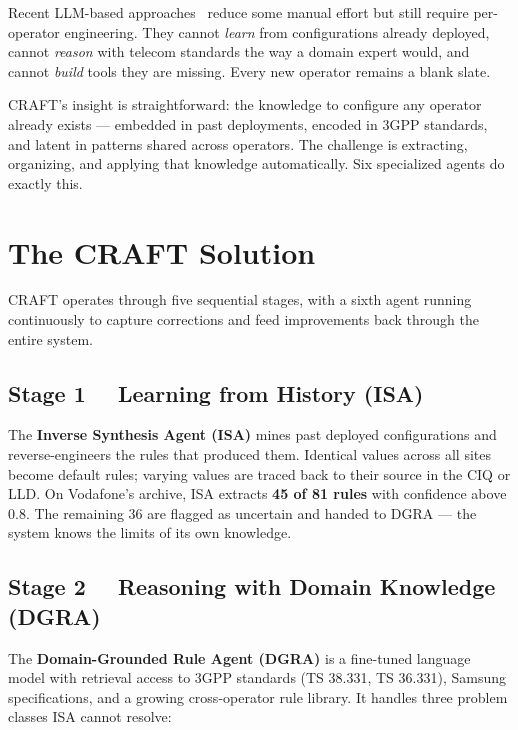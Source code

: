 \documentclass[10.5pt]{article}
\begin{document}
Recent LLM-based approaches~\cite{lira2024largelanguagemodelszero, provvedi2026intentllm, wang2026llmpowered} reduce some manual effort but still require per-operator engineering. They cannot \emph{learn} from configurations already deployed, cannot \emph{reason} with telecom standards the way a domain expert would, and cannot \emph{build} tools they are missing. Every new operator remains a blank slate.

CRAFT's insight is straightforward: the knowledge to configure any operator already exists --- embedded in past deployments, encoded in 3GPP standards, and latent in patterns shared across operators. The challenge is extracting, organizing, and applying that knowledge automatically. Six specialized agents do exactly this.

\section{The CRAFT Solution}

CRAFT operates through five sequential stages, with a sixth agent running continuously to capture corrections and feed improvements back through the entire system.

\subsection*{Stage 1 \ \ Learning from History (ISA)}

The \textbf{Inverse Synthesis Agent (ISA)} mines past deployed configurations and reverse-engineers the rules that produced them. Identical values across all sites become default rules; varying values are traced back to their source in the CIQ or LLD. On Vodafone's archive, ISA extracts \textbf{45 of 81 rules} with confidence above 0.8. The remaining 36 are flagged as uncertain and handed to DGRA --- the system knows the limits of its own knowledge.

\subsection*{Stage 2 \ \ Reasoning with Domain Knowledge (DGRA)}

The \textbf{Domain-Grounded Rule Agent (DGRA)} is a fine-tuned language model with retrieval access to 3GPP standards (TS 38.331, TS 36.331), Samsung specifications, and a growing cross-operator rule library. It handles three problem classes ISA cannot resolve:
\end{document}
